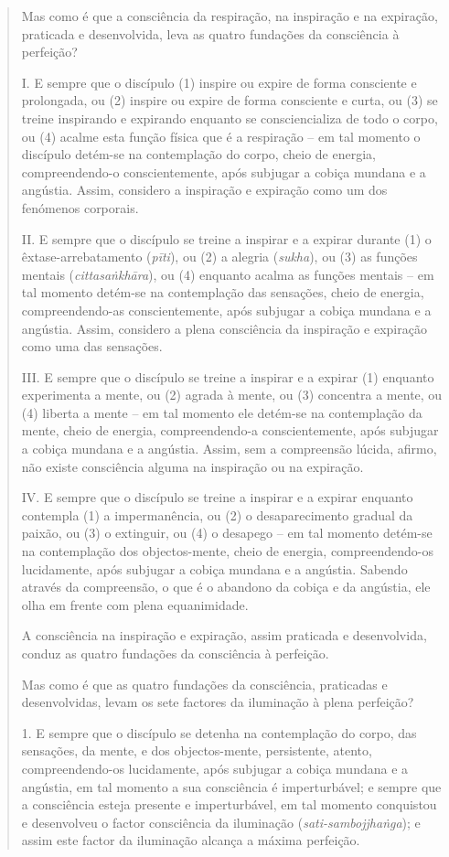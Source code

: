 \begin{quote}
Mas como é que a consciência da respiração, na inspiração e na expiração, praticada e desenvolvida, leva as quatro fundações da consciência à perfeição?

I. E sempre que o discípulo (1) inspire ou expire de forma consciente e prolongada, ou (2) inspire ou expire de forma consciente e curta, ou (3) se treine inspirando e expirando enquanto se consciencializa de todo o corpo, ou (4) acalme esta função física que é a respiração -- em tal momento o discípulo detém-se na contemplação do corpo, cheio de energia, compreendendo-o conscientemente, após subjugar a cobiça mundana e a angústia. Assim, considero a inspiração e expiração como um dos fenómenos corporais.

II. E sempre que o discípulo se treine a inspirar e a expirar durante (1) o êxtase-arrebatamento (\emph{pīti}), ou (2) a alegria (\emph{sukha}), ou (3) as funções mentais (\emph{cittasaṅkhāra}), ou (4) enquanto acalma as funções mentais -- em tal momento detém-se na contemplação das sensações, cheio de energia, compreendendo-as conscientemente, após subjugar a cobiça mundana e a angústia. Assim, considero a plena consciência da inspiração e expiração como uma das sensações.

III. E sempre que o discípulo se treine a inspirar e a expirar (1) enquanto experimenta a mente, ou (2) agrada à mente, ou (3) concentra a mente, ou (4) liberta a mente -- em tal momento ele detém-se na contemplação da mente, cheio de energia, compreendendo-a conscientemente, após subjugar a cobiça mundana e a angústia. Assim, sem a compreensão lúcida, afirmo, não existe consciência alguma na inspiração ou na expiração.

IV. E sempre que o discípulo se treine a inspirar e a expirar enquanto contempla (1) a impermanência, ou (2) o desaparecimento gradual da paixão, ou (3) o extinguir, ou (4) o desapego -- em tal momento detém-se na contemplação dos objectos-mente, cheio de energia, compreendendo-os lucidamente, após subjugar a cobiça mundana e a angústia. Sabendo através da compreensão, o que é o abandono da cobiça e da angústia, ele olha em frente com plena equanimidade.

A consciência na inspiração e expiração, assim praticada e desenvolvida, conduz as quatro fundações da consciência à perfeição.

Mas como é que as quatro fundações da consciência, praticadas e desenvolvidas, levam os sete factores da iluminação à plena perfeição?

1. E sempre que o discípulo se detenha na contemplação do corpo, das sensações, da mente, e dos objectos-mente, persistente, atento, compreendendo-os lucidamente, após subjugar a cobiça mundana e a angústia, em tal momento a sua consciência é imperturbável; e sempre que a consciência esteja presente e imperturbável, em tal momento conquistou e desenvolveu o factor consciência da iluminação (\emph{sati-sambojjhaṅga}); e assim este factor da iluminação alcança a máxima perfeição.


\end{quote}
